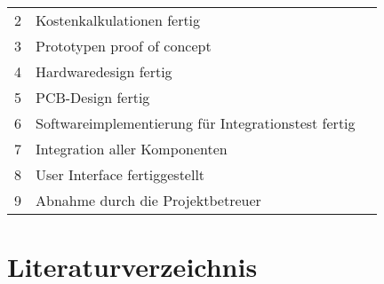 \documentclass[titlepage,12pt,twoside]{article}
\begin{document}
\begin{table}[H]
    \centering
    \begin{tabular}{|c|l|c|}  %
        \hline
        2 & Kostenkalkulationen fertig \\
        3 & Prototypen proof of concept \\
        4 & Hardwaredesign fertig \\
        5 & PCB-Design fertig \\
        6 & Softwareimplementierung für Integrationstest fertig \\
        7 & Integration aller Komponenten \\
        8 & User Interface fertiggestellt \\
        9 & Abnahme durch die Projektbetreuer \\
        \hline
    \end{tabular}
    \label{tab:Tabellenverzeichnis}
\end{table}

\newpage
\section{Literaturverzeichnis}

\newpage
\end{document}
